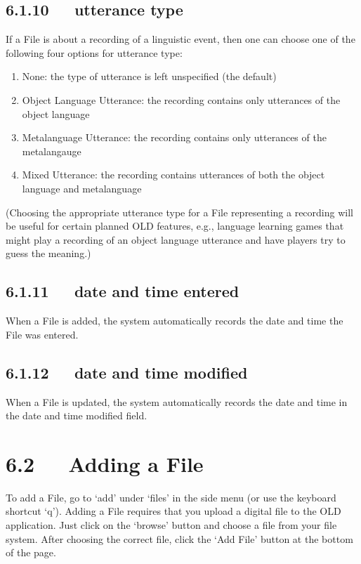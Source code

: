 \documentclass[letterpaper,10pt,english]{sphinxmanual}
\begin{document}
\subsection{6.1.10   utterance type}
\label{documentation:utterance-type}
If a File is about a recording of a linguistic event, then one can choose one of
the following four options for utterance type:
\begin{enumerate}
\item {} 
None: the type of utterance is left unspecified (the default)

\item {} 
Object Language Utterance: the recording contains only utterances of the
object language

\item {} 
Metalanguage Utterance: the recording contains only utterances of the
metalangauge

\item {} 
Mixed Utterance: the recording contains utterances of both the object
language and metalanguage

\end{enumerate}

(Choosing the appropriate utterance type for a File representing a recording will
be useful for certain planned OLD features, e.g., language learning games that
might play a recording of an object language utterance and have players try to
guess the meaning.)


\subsection{6.1.11   date and time entered}
\label{documentation:id6}
When a File is added, the system automatically records the date and time the
File was entered.


\subsection{6.1.12   date and time modified}
\label{documentation:date-and-time-modified}
When a File is updated, the system automatically records the date and time in
the date and time modified field.


\section{6.2   Adding a File}
\label{documentation:adding-a-file}
To add a File, go to `add' under `files' in the side menu (or use the keyboard
shortcut `q').  Adding a File requires that you upload a digital file to the OLD
application.  Just click on the `browse' button and choose a file from your file
system. After choosing the correct file, click the `Add File' button at
the bottom of the page.
\end{document}
